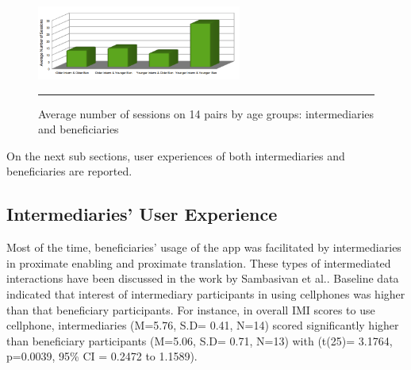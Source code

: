 \begin{figure}[htbp]
  \centering
    \includegraphics[width=0.6\textwidth]{Figures/pairs_usage_sessions.png}
    \rule{35em}{0.5pt}
  \caption{Average number of sessions on  14 pairs by age groups: intermediaries and beneficiaries}
  \label{figure:pairs_usage_sessions}
\end{figure}
On the next sub sections, user experiences of both intermediaries and beneficiaries are reported.
\subsection{Intermediaries' User Experience}
Most of the time, beneficiaries' usage of the app was facilitated by intermediaries in proximate enabling and proximate translation. These types of intermediated interactions have been discussed in the work by Sambasivan et al.\cite{sambasivan2010}. Baseline data indicated that interest of intermediary participants in using cellphones was higher than that beneficiary participants. For instance, in overall IMI scores to use cellphone, intermediaries (M=5.76, S.D= 0.41, N=14) scored  significantly higher than beneficiary participants (M=5.06, S.D= 0.71, N=13) with (t(25)= 3.1764, p=0.0039, 95\% CI = 0.2472 to 1.1589).

